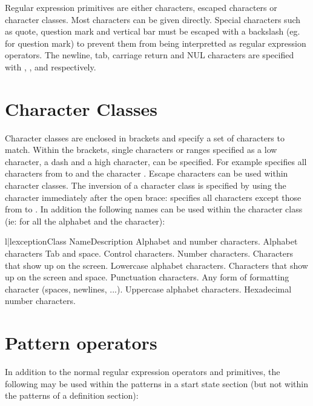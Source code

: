 Regular expression primitives are either characters, escaped characters
or character classes.  Most characters can be given directly.  Special
characters such as quote, question mark and vertical bar must be escaped
with a backslash (eg.  for question mark) to prevent them from being
interpretted as regular expression operators.  The newline, tab, carriage
return and NUL characters are specified with , , 
 and  respectively.

\section{Character Classes}
Character classes are enclosed in brackets and specify a set of characters
to match.  Within the brackets, single characters or ranges specified
as a low character, a dash and a high character, can be specified.  For
example \code{[a-z0]} specifies all characters from  to 
 and the character
.  Escape characters can be used within character classes.  The
inversion of a character class is specified by using the 
 character
immediately after the open brace: \code{[\^{}a-z]} specifies all characters
except those from  to .  
In addition the following names can
be used within the character class (ie:  for all the
alphabet and the  character):

\begin{tableii}{l|l}{exception}{Class Name}{Description}
  \lineii{[:alnum:]}   {Alphabet and number characters.}
  \lineii{[:alpha:]}   {Alphabet characters}
  \lineii{[:blank:]}   {Tab and space.}
  \lineii{[:cntrl:]}   {Control characters.}
  \lineii{[:digit:]}   {Number characters.}
  \lineii{[:graph:]}   {Characters that show up on the screen.}
  \lineii{[:lower:]}   {Lowercase alphabet characters.}
  \lineii{[:print:]}   {Characters that show up on the screen and space.}
  \lineii{[:punct:]}   {Punctuation characters.}
  \lineii{[:space:]}   {Any form of formatting character (spaces, newlines, ...).}
  \lineii{[:upper:]}   {Uppercase alphabet characters.}
  \lineii{[:xdigit:]}  {Hexadecimal number characters.}
\end{tableii}


\section{Pattern operators}
In addition to the normal regular expression operators and primitives,
the following may be used within the patterns in a start state section
(but not within the patterns of a definition section):


